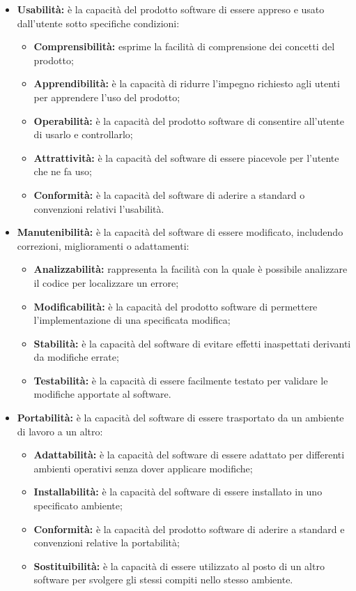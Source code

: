 \begin{itemize}
\item \textbf{Usabilità:} è la capacità del prodotto software di essere appreso e usato dall'utente sotto specifiche condizioni:
\begin{itemize}
	\item \textbf{Comprensibilità:} esprime la facilità di comprensione dei concetti del prodotto;
	\item \textbf{Apprendibilità:} è la capacità di ridurre l'impegno richiesto agli utenti per apprendere l'uso del prodotto;
	\item \textbf{Operabilità:} è la capacità del prodotto software di consentire all'utente di usarlo e controllarlo;
	\item \textbf{Attrattività:} è la capacità del software di essere piacevole per l'utente che ne fa uso;
	\item \textbf{Conformità:} è la capacità del software di aderire a standard o convenzioni relativi l'usabilità.
\end{itemize}
\item \textbf{Manutenibilità:} è la capacità del software di essere modificato, includendo correzioni, miglioramenti o adattamenti:
\begin{itemize}
	\item \textbf{Analizzabilità:} rappresenta la facilità con la quale è possibile analizzare il codice per localizzare un errore;
	\item \textbf{Modificabilità:} è la capacità del prodotto software di permettere l'implementazione di una specificata modifica;
	\item \textbf{Stabilità:} è la capacità del software di evitare effetti inaspettati derivanti da modifiche errate;
	\item \textbf{Testabilità:} è la capacità di essere facilmente testato per validare le modifiche apportate al software.
\end{itemize}

\item \textbf{Portabilità:} è la capacità del software di essere trasportato da un ambiente di lavoro a un altro:
\begin{itemize}
	\item \textbf{Adattabilità:} è la capacità del software di essere adattato per differenti ambienti operativi senza dover applicare modifiche;
	\item \textbf{Installabilità:} è la capacità del software di essere installato in uno specificato ambiente;
	\item \textbf{Conformità:} è la capacità del prodotto software di aderire a standard e convenzioni relative la portabilità;
	\item \textbf{Sostituibilità:} è la capacità di essere utilizzato al posto di un altro software per svolgere gli stessi compiti nello stesso ambiente.
\end{itemize}

\end{itemize}



